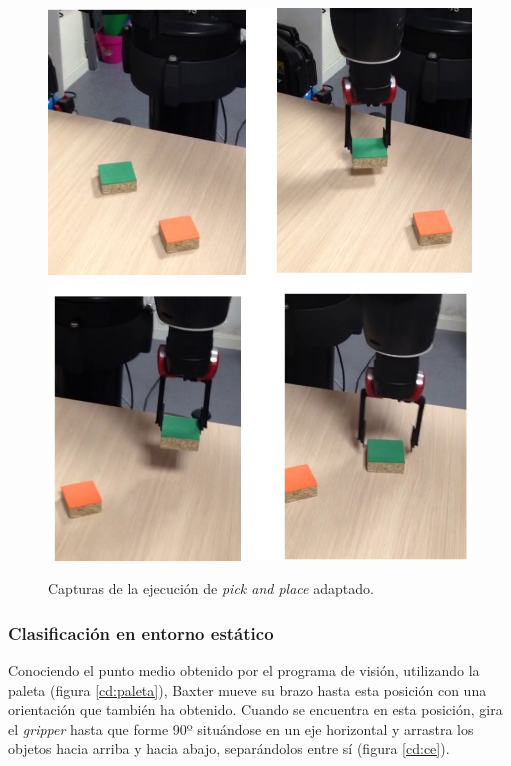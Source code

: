 \begin{figure}[H]
	\centering %
	\label{cd:pnp}
	\includegraphics[scale=0.25]{imagenes/pandp.jpg}
	\caption{Capturas de la ejecución de \textit{pick and place} adaptado.}
\end{figure}

\subsubsection{Clasificación en entorno estático}
\noindent Conociendo el punto medio obtenido por el programa de visión, utilizando la paleta (figura \ref{cd:paleta}), Baxter mueve su brazo hasta esta posición con una orientación que también ha obtenido. Cuando se encuentra en esta posición, gira el \textit{gripper} hasta que forme 90º situándose en un eje horizontal y arrastra los objetos hacia arriba y hacia abajo, separándolos entre sí (figura \ref{cd:ce}). \\

